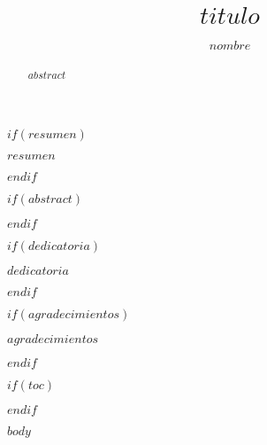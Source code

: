 \documentclass{umemoria}
\author{$nombre$}
\title{$titulo$}
\begin{document}
\frontmatter
\maketitle

$if(resumen)$
\begin{resumen}
$resumen$
\end{resumen}
$endif$

$if(abstract)$
\begin{abstract}
$abstract$
\end{abstract}
$endif$

$if(dedicatoria)$
\begin{dedicatoria}
$dedicatoria$
\end{dedicatoria}
$endif$

$if(agradecimientos)$
\begin{thanks}
$agradecimientos$
\end{thanks}
$endif$

$if(toc)$
\tableofcontents
\listoftables %
\listoffigures %
$endif$

\mainmatter

$body$
\end{document}
